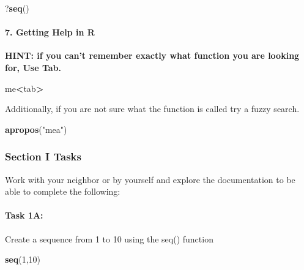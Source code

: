 \documentclass[]{article}
\newenvironment{Shaded}{\begin{snugshade}}{\end{snugshade}}
\newcommand{\KeywordTok}[1]{\textcolor[rgb]{0.13,0.29,0.53}{\textbf{#1}}}
\newcommand{\DecValTok}[1]{\textcolor[rgb]{0.00,0.00,0.81}{#1}}
\newcommand{\StringTok}[1]{\textcolor[rgb]{0.31,0.60,0.02}{#1}}
\newcommand{\OperatorTok}[1]{\textcolor[rgb]{0.81,0.36,0.00}{\textbf{#1}}}
\newcommand{\NormalTok}[1]{#1}
\let\oldparagraph\paragraph
\renewcommand{\paragraph}[1]{\oldparagraph{#1}\mbox{}}
\begin{document}
\begin{Shaded}
\begin{Highlighting}[]
\NormalTok{?}\KeywordTok{seq}\NormalTok{()}
\end{Highlighting}
\end{Shaded}

\paragraph{7. Getting Help in R}\label{getting-help-in-r}

\textbf{HINT: if you can't remember exactly what function you are
looking for, Use Tab.}

\begin{Shaded}
\begin{Highlighting}[]
\NormalTok{me}\OperatorTok{<}\NormalTok{tab}\OperatorTok{>}
\end{Highlighting}
\end{Shaded}

Additionally, if you are not sure what the function is called try a
fuzzy search.\\

\begin{Shaded}
\begin{Highlighting}[]
\KeywordTok{apropos}\NormalTok{(}\StringTok{"mea"}\NormalTok{) }
\end{Highlighting}
\end{Shaded}

\subsubsection{Section I Tasks}\label{section-i-tasks}

Work with your neighbor or by yourself and explore the documentation to
be able to complete the following:

\paragraph{Task 1A:}\label{task-1a}

Create a sequence from 1 to 10 using the seq() function

\begin{Shaded}
\begin{Highlighting}[]
\KeywordTok{seq}\NormalTok{(}\DecValTok{1}\NormalTok{,}\DecValTok{10}\NormalTok{)}
\end{Highlighting}
\end{Shaded}
\end{document}
